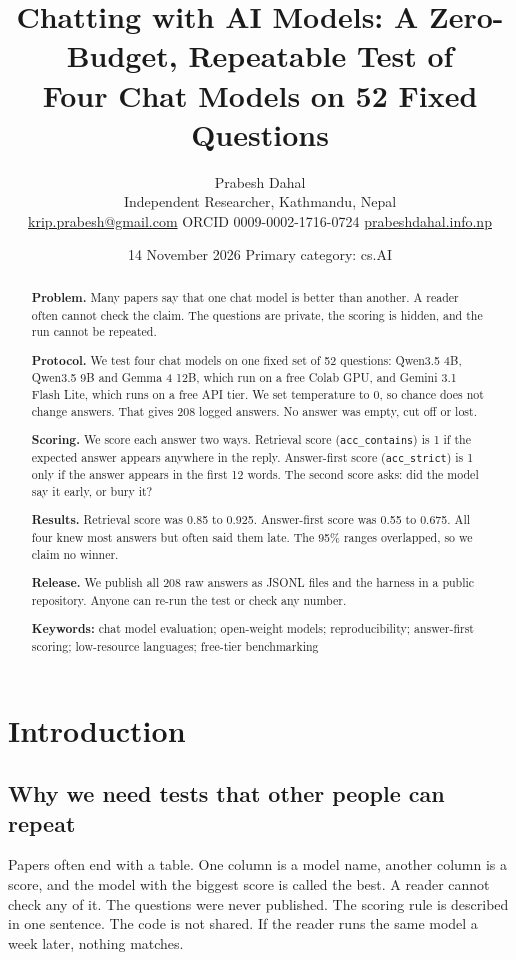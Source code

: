 \documentclass[11pt,a4paper]{article}
\title{\bfseries Chatting with AI Models: A Zero-Budget, Repeatable Test of\\ Four Chat Models on 52 Fixed Questions}
\author{Prabesh Dahal\\
\small Independent Researcher, Kathmandu, Nepal\\
\small \href{mailto:krip.prabesh@gmail.com}{krip.prabesh@gmail.com} \quad
ORCID 0009-0002-1716-0724 \quad
\href{https://prabeshdahal.info.np/}{prabeshdahal.info.np}}
\date{14 November 2026 \quad\textbar\quad Primary category: cs.AI}
\begin{document}
\maketitle

\begin{abstract}
\noindent\textbf{Problem.} Many papers say that one chat model is better than another. A reader often cannot check the claim. The questions are private, the scoring is hidden, and the run cannot be repeated.

\noindent\textbf{Protocol.} We test four chat models on one fixed set of 52 questions: Qwen3.5 4B, Qwen3.5 9B and Gemma 4 12B, which run on a free Colab GPU, and Gemini 3.1 Flash Lite, which runs on a free API tier. We set temperature to 0, so chance does not change answers. That gives 208 logged answers. No answer was empty, cut off or lost.

\noindent\textbf{Scoring.} We score each answer two ways. Retrieval score (\texttt{acc\_contains}) is 1 if the expected answer appears anywhere in the reply. Answer-first score (\texttt{acc\_strict}) is 1 only if the answer appears in the first 12 words. The second score asks: did the model say it early, or bury it?

\noindent\textbf{Results.} Retrieval score was 0.85 to 0.925. Answer-first score was 0.55 to 0.675. All four knew most answers but often said them late. The 95\% ranges overlapped, so we claim no winner.

\noindent\textbf{Release.} We publish all 208 raw answers as JSONL files and the harness in a public repository. Anyone can re-run the test or check any number.

\medskip
\noindent\textbf{Keywords:} chat model evaluation; open-weight models; reproducibility; answer-first scoring; low-resource languages; free-tier benchmarking
\end{abstract}

\section{Introduction}

\subsection{Why we need tests that other people can repeat}

Papers often end with a table. One column is a model name, another column is a score, and the model with the biggest score is called the best. A reader cannot check any of it. The questions were never published. The scoring rule is described in one sentence. The code is not shared. If the reader runs the same model a week later, nothing matches.
\end{document}
